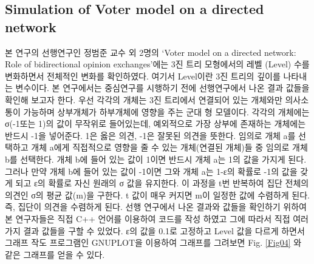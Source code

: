 \documentclass{gshs-report-v1.2}
\begin{document}
\subsection{Simulation of Voter model on a directed network}

본 연구의 선행연구인 정범준 교수 외 2명의 ‘Voter model on a directed network: Role of bidirectional opinion exchanges’에는 3진 트리 모형에서의 레벨 (Level) 수를 변화하면서 전체적인 변화를 확인하였다. 여기서 Level이란 3진 트리의 깊이를 나타내는 변수이다.
본 연구에서는 중심연구를 시행하기 전에 선행연구에서 나온 결과 값들을 확인해 보고자 한다.
우선 각각의 개체는 3진 트리에서 연결되어 있는 개체와만 의사소통이 가능하며 상부개체가 하부개체에 영향을 주는 군대 형 모델이다. 각각의 개체에는  σ(-1또는 1)의 값이 무작위로 들어있는데, 예외적으로 가장 상부에 존재하는 개체에는 반드시 -1을 넣어준다. 1은 옳은 의견, -1은 잘못된 의견을 뜻한다.  임의로 개체 a를 선택하고 개체 a에게 직접적으로 영향을 줄 수 있는 개체(연결된 개체)들 중 임의로 개체 b를 선택한다. 개체 b에 들어 있는 값이 1이면 반드시 개체 a는 1의 값을 가지게 된다. 그러나 만약 개체 b에 들어 있는 값이 -1이면 그와 개체 a는 1-ε의 확률로 -1의 값을 갖게 되고 ε의 확률로 자신 원래의 σ 값을 유지한다. 이 과정을 t번 반복하여 집단 전체의 의견인 σ의 평균 값(m)을 구한다. t 값이 매우 커지면 m이 일정한 값에 수렴하게 된다. 즉, 집단이 의견을 수렴하게 된다.
선행 연구에서 나온 결과와 값들을 확인하기 위하여 본 연구자들은 직접 C++ 언어를 이용하여 코드를 작성 하였고 그에 따라서 직접 여러 가지 결과 값들을 구할 수 있었다.
ε의 값을 0.1로 고정하고 Level 값을 다르게 하면서 그래프 작도 프로그램인 GNUPLOT을 이용하여 그래프를 그려보면 Fig. \ref{Fig04} 와 같은 그래프를 얻을 수 있다.
 
\end{document}
